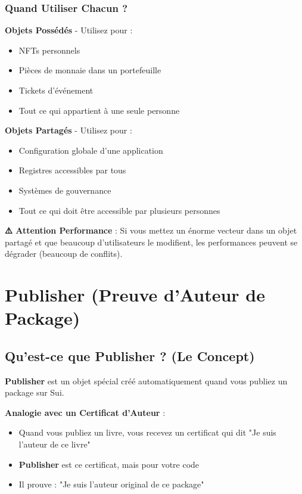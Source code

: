 \documentclass[11pt]{article}
\begin{document}
\subsubsection{Quand Utiliser Chacun ?}

\begin{exampleBox}
\textbf{Objets Possédés} - Utilisez pour :
\begin{itemize}
  \item NFTs personnels
  \item Pièces de monnaie dans un portefeuille
  \item Tickets d'événement
  \item Tout ce qui appartient à une seule personne
\end{itemize}

\textbf{Objets Partagés} - Utilisez pour :
\begin{itemize}
  \item Configuration globale d'une application
  \item Registres accessibles par tous
  \item Systèmes de gouvernance
  \item Tout ce qui doit être accessible par plusieurs personnes
\end{itemize}
\end{exampleBox}

\begin{warnBox}
\textbf{⚠️ Attention Performance} : Si vous mettez un énorme vecteur dans un objet partagé et que beaucoup d'utilisateurs le modifient, les performances peuvent se dégrader (beaucoup de conflits).
\end{warnBox}

\section{Publisher (Preuve d'Auteur de Package)}

\subsection{Qu'est-ce que Publisher ? (Le Concept)}

\textbf{Publisher} est un objet spécial créé automatiquement quand vous publiez un package sur Sui.

\begin{explainBox}
\textbf{Analogie avec un Certificat d'Auteur} :
\begin{itemize}
  \item Quand vous publiez un livre, vous recevez un certificat qui dit "Je suis l'auteur de ce livre"
  \item \textbf{Publisher} est ce certificat, mais pour votre code
  \item Il prouve : "Je suis l'auteur original de ce package"
\end{itemize}
\end{explainBox}
\end{document}
